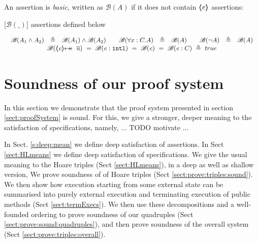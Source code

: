 \newcommand{\Basic}[1]{{\mathcal B}(#1)}

An assertion is {\emph {basic}}, written as $\Basic A$ if it does not contain $\langle\!\!\langle \mathit{e} \rangle\!\!\rangle$ assertions:
\begin{definition}
\label{def:Basic}
[$\Basic{\_}$] assertions  defined below

$
\begin{array}{c}
\begin{array}{rcrlrcrlrcrl}
  \Basic  {A_1  \wedge  A_2} & \triangleq &   \Basic  { A_1}  \wedge    \Basic  {A_2}    
 & &
 \Basic  {\forall x:C.A} & \triangleq & \Basic  {A}
 & & 
  \Basic  {\neg A} &  \triangleq & \Basic A
 \end{array}
 \\ 
   \Basic {\protectedFrom \re {\overline {u}}} \ = \   
  \Basic  {\internal \re}  \ = \   %
    \Basic {\re} \ = \     
     \Basic {\re:C}\   \triangleq \    true
\end{array}
$
\label{f:Basic}
\end{definition}




\section{Soundness of our proof system}

In this section we demonstrate that the proof system presented in section \ref{sect:proofSystem} is sound. 
For this, we give a stronger, deeper meaning to the satisfaction of specifications, namely, ... TODO motivate ... 

In Sect.  \ref{s:deep:mean} we define deep satisfaction of assertions. 
In Sect \ref{sect:HLmeans} we define deep satisfaction of specifications.
We give the usual meaning to the Hoare triples (Sect \ref{sect:HLmeans}), in a deep as well as shallow version,
We prove soundness of of Hoare triples (Sect \ref{sect:prove:triples:sound}).
We then show how execution starting from some external state can be summarised into purely external execution and terminating execution of public methods (Sect \ref{sect:termExecs}). We then use these decompositions and a well-founded ordering to prove soundness of our quadruples  (Sect \ref{sect:prove:sound:quadruples}), and then prove soundness of the overall system  (Sect \ref{sect:prove:triples:overall}). 



